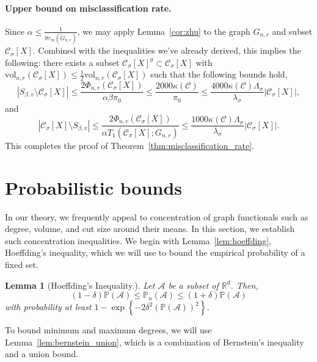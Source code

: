 \documentclass[11pt,twoside]{article}
\newtheorem{lemma}{Lemma}
\newcommand{\set}[1]{\left\{#1\right\}}
\newcommand{\vol}{\mathrm{vol}}
\newcommand{\abs}[1]{\left \lvert #1 \right \rvert}
\newcommand{\Reals}{\mathbb{R}}
\newcommand{\1}{\mathbf{1}}
\newcommand{\Xbf}{X}             %
\newcommand{\Pbb}{\mathbb{P}}
\newcommand{\Cset}{\mathcal{C}}
\newcommand{\Csig}{\Cset_{\sigma}}
\begin{document}
\paragraph{Upper bound on misclassification rate.}
Since $\alpha \leq \frac{1}{9\tau_{\infty}(\widetilde{G}_{n,r})}$, we may apply Lemma~\ref{cor:zhu} to the graph $G_{n,r}$ and subset $\Csig[\Xbf]$. Combined with the inequalities we've already derived, this implies the following: there exists a subset $\Csig[\Xbf]^g \subset \Csig[\Xbf]$ with $\vol_{n,r}(\Csig[\Xbf]) \leq \frac{1}{2}\vol_{n,r}(\Csig[\Xbf])$ such that the following bounds hold,
\begin{equation*}
\abs{S_{\beta,v} \setminus \Csig[\Xbf]} \leq \frac{2\Phi_{n,r}(\Csig[\Xbf])}{\alpha \beta \pi_0} \leq \frac{2000 \kappa(\Cset)}{\pi_0} \leq \frac{4000 \kappa(\Cset) \Lambda_{\sigma}}{\lambda_{\sigma}}\abs{\Csig[\Xbf]},
\end{equation*}
and
\begin{equation*}
\abs{\Csig[\Xbf] \setminus S_{\beta,v}} \leq \frac{2\Phi_{n,r}(\Csig[\Xbf])}{\alpha T_1(\Csig[\Xbf];G_{n,r})} \leq \frac{1000 \kappa(\Cset) \Lambda_{\sigma}}{\lambda_{\sigma}}\abs{\Csig[\Xbf]}.
\end{equation*}
This completes the proof of Theorem~\ref{thm:misclassification_rate}.

\section{Probabilistic bounds}
\label{sec: concentration}

In our theory, we frequently appeal to concentration of graph functionals such as degree, volume, and cut size around their means. In this section, we establish such concentration inequalities. We begin with Lemma~\ref{lem:hoeffding}, Hoeffding's inequality, which we will use to bound the empirical probability of a fixed set.
\begin{lemma}[Hoeffding's Inequality.]
	\label{lem:hoeffding_2}
	Let $\mathcal{A}$ be a subset of $\Reals^d$. Then,
	\begin{equation*}
	(1 - \delta) \Pbb(\mathcal{A}) \leq \Pbb_n(\mathcal{A}) \leq (1 + \delta)\Pbb(\mathcal{A})
	\end{equation*}
	with probability at least $1 - \exp\set{-2\delta^2(\Pbb(\mathcal{A}))^2}$. 
\end{lemma}

To bound minimum and maximum degrees, we will use Lemma~\ref{lem:bernstein_union}, which is a combination of Bernstein's inequality and a union bound.
\end{document}
